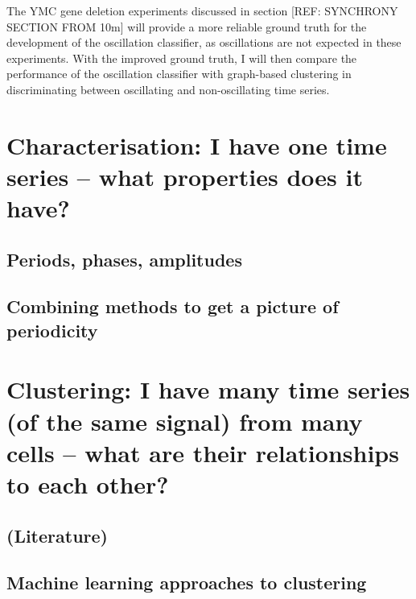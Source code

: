 The YMC gene deletion experiments discussed in section [REF: SYNCHRONY SECTION FROM 10m] will provide a more reliable ground truth for the development of the oscillation classifier, as oscillations are not expected in these experiments.
With the improved ground truth, I will then compare the performance of the oscillation classifier with graph-based clustering in discriminating between oscillating and non-oscillating time series.

\section{Characterisation: I have one time series -- what properties does it have?}
\label{sec:analysis-characterisation}

\subsection{Periods, phases, amplitudes}
\label{subsec:analysis-characterisation-quantities}

\subsection{Combining methods to get a picture of periodicity}
\label{subsec:analysis-characterisation-combined}


\section{Clustering: I have many time series (of the same signal) from many cells -- what are their relationships to each other?}
\label{sec:analysis-clustering}

\subsection{(Literature)}
\label{subsec:analysis-clustering-literature}

\subsection{Machine learning approaches to clustering}
\label{subsec:analysis-clustering-ml}

